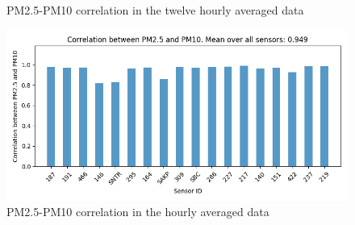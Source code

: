 \documentclass[12pt,a4paper,twoside]{scrartcl}
\numberwithin{equation}{section}
\newcounter{mypagecount}%
\newenvironment{interlude}{%
  \clearpage
  \setcounter{mypagecount}{\value{page}}%
  \thispagestyle{empty}%
  \pagestyle{empty}%
}{%
  \clearpage
  \setcounter{page}{\value{mypagecount}}%
}
\begin{document}
\begin{interlude}
\begin{appendices}
\begin{center}
\begin{figure}[H]
        \caption[PM2.5-PM10 correlation (twelve hour average)]{PM2.5-PM10 correlation in the twelve hourly averaged data}
      \end{figure}
      \begin{figure}[H]
        \centerline{\includegraphics[width=1\textwidth]{figures/data_files_changes/1H_P1_P2_correlation}}
        \caption[PM2.5-PM10 correlation (one hour average)]{PM2.5-PM10 correlation in the hourly averaged data}
      \end{figure}  
    \end{center}
    
    \clearpage

\end{appendices}
\end{interlude}
\end{document}

